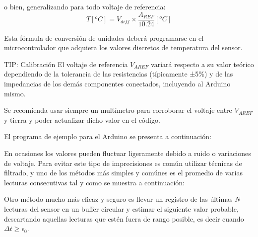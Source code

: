 \noindent o bien, generalizando para todo voltaje de referencia:
\begin{equation*}
	T[^{o}C] = V_{diff} \times \frac{A_{REF}}{ 10.24 }[^{o}C]
\end{equation*}

Esta fórmula de conversión de unidades deberá programarse en el microcontrolador que adquiera los valores discretos de temperatura del sensor.

\medskip
\begin{greenbox}{\large TIP: Calibración}
	El voltaje de referencia $V_{AREF}$ variará respecto a su valor teórico dependiendo de la tolerancia de las resistencias (típicamente ±5\%) y de las impedancias de los demás componentes conectados, incluyendo al Arduino mismo.

	\smallskip

	Se recomienda usar siempre un multímetro para corroborar el voltaje entre $V_{AREF}$ y tierra y poder actualizar dicho valor en el código.\footnotemark{}
\end{greenbox}
\medskip

El programa de ejemplo para el Arduino\footnotemark{} se presenta a continuación:

\begin{minipage}{\linewidth}

\end{minipage}


En ocasiones los valores pueden fluctuar ligeramente debido a ruido o variaciones de voltaje.
Para evitar este tipo de imprecisiones es común utilizar técnicas de filtrado, y uno de los métodos más simples y comúnes es el promedio de varias lecturas consecutivas tal y como se muestra a continuación:

\begin{minipage}{\linewidth}

\end{minipage}

Otro método mucho más eficaz y seguro es llevar un registro de las últimas $N$ lecturas del sensor en un buffer circular y estimar el siguiente valor probable, descartando aquellas lecturas que estén fuera de rango posible, es decir cuando $\Delta{}t \geq \epsilon{}_0$.

